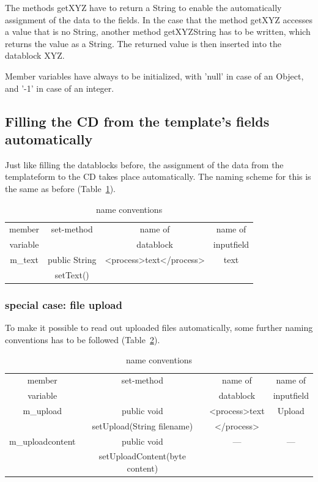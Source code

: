 The methods {\name getXYZ} have to return a String to enable the automatically assignment
of the data to the fields. In the case that the method {\name getXYZ} accesses a value
that is no String, another method {\name getXYZString} has to be written, which returns 
the value as a String.
The returned value is then inserted into the datablock {\name XYZ}.

Member variables have always to be initialized, with 'null' in case of an Object,
and '-1' in case of an integer.

\subsection{Filling the CD from the template's fields automatically}
Just like filling the datablocks before, the assignment of the data from the 
templateform to the CD takes place automatically. The naming scheme for this 
is the same as before (Table~\ref{nameConv2}).

\begin{table}
\begin{center}
\begin{tabular}{|c|c|c|c|}
\hline
member &
set-method&
name of&  
name of \\
variable&
&
datablock&
inputfield\\ \hline  
m\_text&
public String&
<process>text</process>&
text\\
&
setText()&
&  \\ \hline
\end{tabular}
\caption[name conventions]{name conventions}
\label{nameConv2}
\end{center} 
\end{table}

\subsubsection{special case: file upload}
To make it possible to read out uploaded files automatically, some further
naming conventions has to be followed (Table~\ref{nameConv3}).

\begin{table}
\begin{center}
\begin{tabular}{|c|c|c|c|}
\hline
member &
set-method&
name of&  
name of \\
variable&
&
datablock&
inputfield\\ \hline  
m\_upload&
public void&
<process>text&
Upload\\
&
setUpload(String filename)&
</process>&  \\ \hline
m\_uploadcontent&
public void&
---&
---\\
&
setUploadContent(byte content)&
& \\ \hline

\end{tabular}
\caption[name conventions]{name conventions}
\label{nameConv3}
\end{center} 
\end{table}

